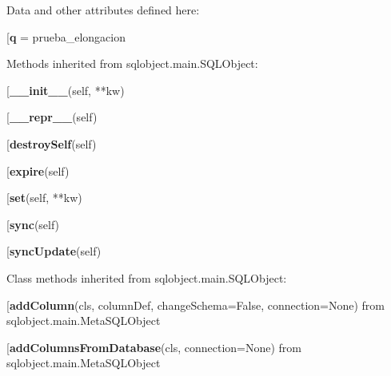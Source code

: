 Data and other attributes defined here:\\
\begin{description}\item[{\bf q} = prueba\_elongacion\end{description}


Methods inherited from sqlobject.main.SQLObject:\\
\begin{description}\item[{\bf \_\_init\_\_}(self, **kw)\end{description}

\begin{description}\item[{\bf \_\_repr\_\_}(self)\end{description}

\begin{description}\item[{\bf destroySelf}(self)\end{description}

\begin{description}\item[{\bf expire}(self)\end{description}

\begin{description}\item[{\bf set}(self, **kw)\end{description}

\begin{description}\item[{\bf sync}(self)\end{description}

\begin{description}\item[{\bf syncUpdate}(self)\end{description}


Class methods inherited from sqlobject.main.SQLObject:\\
\begin{description}\item[{\bf addColumn}(cls, columnDef, changeSchema=False, connection=None) from sqlobject.main.MetaSQLObject\end{description}

\begin{description}\item[{\bf addColumnsFromDatabase}(cls, connection=None) from sqlobject.main.MetaSQLObject\end{description}


